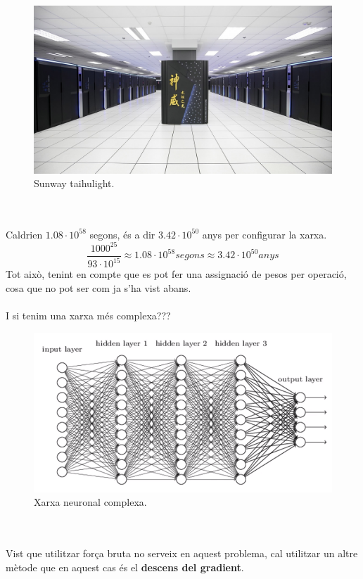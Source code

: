 \documentclass[12pt]{article}
\begin{document}
\pagebreak
\begin{figure}[h!]
	\centering
	\includegraphics[scale=0.3]{imatges/dg/sunlight.jpg}
	\caption{Sunway taihulight.}
\end{figure}
\\\\Caldrien $1.08 \cdot 10^{58}$ segons, és a dir $3.42 \cdot 10^{50}$ anys per configurar la xarxa. 
$$\frac{1000^{25}}{93 \cdot 10^{15}} \approx 1.08 \cdot 10^{58} segons \approx 3.42 \cdot 10^{50} anys$$ 
Tot això, tenint en compte que es pot fer una assignació de pesos per operació, cosa que no pot ser com ja s'ha vist abans.
\\\\I si tenim una xarxa més complexa???
\begin{figure}[h!]
	\centering
	\includegraphics[scale=0.25]{imatges/dg/xnComplexa.png}
	\caption{Xarxa neuronal complexa.}
\end{figure}
\\\\Vist que utilitzar força bruta no serveix en aquest problema, cal utilitzar un altre mètode que en aquest cas és el \textbf{descens del gradient}.
\end{document}
